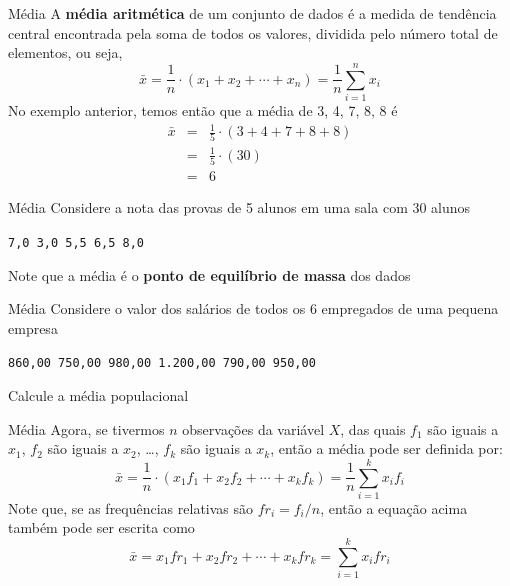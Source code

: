 \documentclass[10pt]{beamer}\usepackage[]{graphicx}\usepackage[]{color}
\theoremstyle{definition}
\begin{document}
\begin{frame}{Média}
  A \textbf{média aritmética} de um conjunto de dados é a medida de
  tendência central encontrada pela soma de todos os valores, dividida
  pelo número total de elementos, ou seja,
  \begin{equation*}
    \bar{x} = \frac{1}{n} \cdot (x_1 + x_2 + \cdots + x_n) = \frac{1}{n}
    \sum_{i=1}^{n} x_i
  \end{equation*}
  No exemplo anterior, temos então que a média de 3, 4, 7, 8, 8 é
  \begin{eqnarray*}
    \bar{x} &=& \frac{1}{5} \cdot (3 + 4 + 7 + 8 + 8) \\
            &=& \frac{1}{5} \cdot (30) \\
            &=& 6
  \end{eqnarray*}
\end{frame}

\begin{frame}{Média}
  Considere a nota das provas de 5 alunos em uma sala com 30 alunos
  \begin{center}
    \texttt{7,0 3,0 5,5 6,5 8,0}
  \end{center}
  \begin{block}{}
    Note que a média é o \textbf{ponto de equilíbrio de massa} dos dados
  \end{block}
\end{frame}

\begin{frame}{Média}
  Considere o valor dos salários de todos os 6 empregados de uma pequena
  empresa
  \begin{center}
    \texttt{860,00 750,00 980,00 1.200,00 790,00 950,00}
  \end{center}
  Calcule a média populacional
\end{frame}

\begin{frame}{Média}
  Agora, se tivermos $n$ observações da variável $X$, das quais $f_1$
  são iguais a $x_1$, $f_2$ são iguais a $x_2$, \ldots, $f_k$ são iguais
  a $x_k$, então a média pode ser definida por:
  \begin{equation*}
    \bar{x} = \frac{1}{n} \cdot (x_1 f_1 + x_2 f_2 + \cdots + x_k f_k) = \frac{1}{n}
    \sum_{i=1}^{k} x_i f_i
  \end{equation*}
  Note que, se as frequências relativas são $fr_i = f_i/n$, então a
  equação acima também pode ser escrita como
  \begin{equation*}
    \bar{x} = x_1 fr_1 + x_2 fr_2 + \cdots + x_k fr_k = \sum_{i=1}^{k} x_i fr_i
  \end{equation*}
\end{frame}
\end{document}
